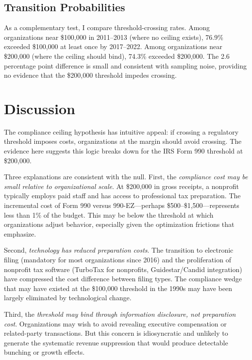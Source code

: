 \documentclass[12pt]{article}
\begin{document}


\subsection{Transition Probabilities}

As a complementary test, I compare threshold-crossing rates. Among organizations near \$100,000 in 2011--2013 (where no ceiling exists), 76.9\% exceeded \$100,000 at least once by 2017--2022. Among organizations near \$200,000 (where the ceiling should bind), 74.3\% exceeded \$200,000. The 2.6 percentage point difference is small and consistent with sampling noise, providing no evidence that the \$200,000 threshold impedes crossing.


\section{Discussion}
\label{sec:discussion}

The compliance ceiling hypothesis has intuitive appeal: if crossing a regulatory threshold imposes costs, organizations at the margin should avoid crossing. The evidence here suggests this logic breaks down for the IRS Form 990 threshold at \$200,000.

Three explanations are consistent with the null. First, the \textit{compliance cost may be small relative to organizational scale}. At \$200,000 in gross receipts, a nonprofit typically employs paid staff and has access to professional tax preparation. The incremental cost of Form 990 versus 990-EZ---perhaps \$500--\$1,500---represents less than 1\% of the budget. This may be below the threshold at which organizations adjust behavior, especially given the optimization frictions that \citet{chetty2011adjustment} emphasize.

Second, \textit{technology has reduced preparation costs}. The transition to electronic filing (mandatory for most organizations since 2016) and the proliferation of nonprofit tax software (TurboTax for nonprofits, Guidestar/Candid integration) have compressed the cost difference between filing types. The compliance wedge that may have existed at the \$100,000 threshold in the 1990s may have been largely eliminated by technological change.

Third, the \textit{threshold may bind through information disclosure, not preparation cost}. Organizations may wish to avoid revealing executive compensation or related-party transactions. But this concern is idiosyncratic and unlikely to generate the systematic revenue suppression that would produce detectable bunching or growth effects.
\end{document}

